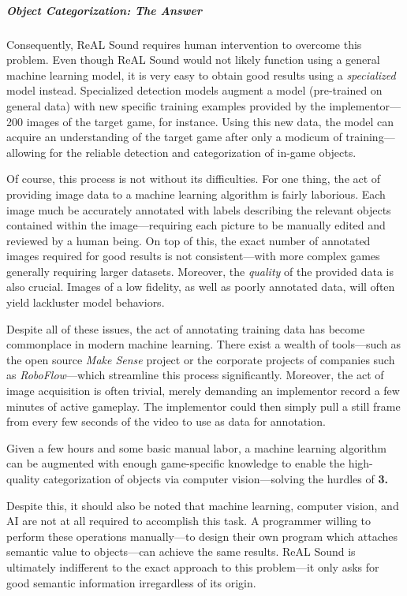 \documentclass{report}
\newcommand{\rs}{ReAL Sound\xspace}
\begin{document}
\subparagraph{Object Categorization: \emph{The Answer}}
Consequently, \rs requires human intervention to overcome this problem. Even though \rs would not likely function using a general machine learning model, it is very easy to obtain good results using a \emph{specialized} model instead. Specialized detection models augment a model (pre-trained on general data) with new specific training examples provided by the implementor---200 images of the target game, for instance. Using this new data, the model can acquire an understanding of the target game after only a modicum of training---allowing for the reliable detection and categorization of in-game objects.

Of course, this process is not without its difficulties. For one thing, the act of providing image data to a machine learning algorithm is fairly laborious. Each image much be accurately annotated with labels describing the relevant objects contained within the image---requiring each picture to be manually edited and reviewed by a human being. On top of this, the exact number of annotated images required for good results is not consistent---with more complex games generally requiring larger datasets. Moreover, the \emph{quality} of the provided data is also crucial. Images of a low fidelity, as well as poorly annotated data, will often yield lackluster model behaviors.

Despite all of these issues, the act of annotating training data has become commonplace in modern machine learning. There exist a wealth of tools---such as the open source \emph{Make Sense} project\cite{make-sense} or the corporate projects of companies such as \emph{RoboFlow}\cite{Roboflow_Supervision}---which streamline this process significantly. Moreover, the act of image acquisition is often trivial, merely demanding an implementor record a few minutes of active gameplay. The implementor could then simply pull a still frame from every few seconds of the video to use as data for annotation. 

Given a few hours and some basic manual labor, a machine learning algorithm can be augmented with enough game-specific knowledge to enable the high-quality categorization of objects via computer vision---solving the hurdles of \textbf{3.} 

Despite this, it should also be noted that machine learning, computer vision, and AI are not at all required to accomplish this task. A programmer willing to perform these operations manually---to design their own program which attaches semantic value to objects---can achieve the same results. \rs is ultimately indifferent to the exact approach to this problem---it only asks for good semantic information irregardless of its origin.
\end{document}
